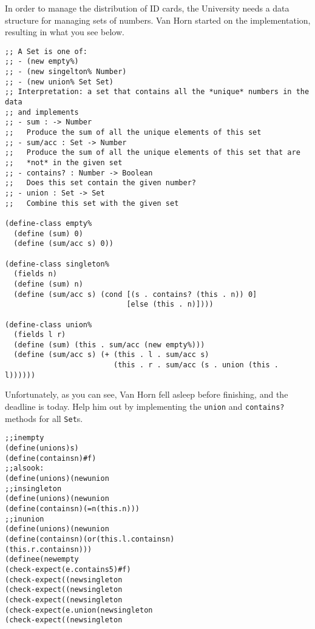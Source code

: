 \documentclass[12pt]{article}                   %
\def\pts#1{\marginpar{\footnotesize \raggedright  \fbox{#1 {\sc Points}}}}
\begin{document}
\vfill\thispagestyle{empty}
\newpage



\begin{problem} \pts{19}


In order to manage the distribution of ID cards, the University needs
a data structure for managing sets of numbers.  Van Horn started on
the implementation, resulting in what you see below.

\begin{verbatim}
;; A Set is one of:
;; - (new empty%)
;; - (new singelton% Number)
;; - (new union% Set Set)
;; Interpretation: a set that contains all the *unique* numbers in the data
;; and implements
;; - sum : -> Number
;;   Produce the sum of all the unique elements of this set
;; - sum/acc : Set -> Number
;;   Produce the sum of all the unique elements of this set that are
;;   *not* in the given set
;; - contains? : Number -> Boolean
;;   Does this set contain the given number?
;; - union : Set -> Set
;;   Combine this set with the given set

(define-class empty%
  (define (sum) 0)
  (define (sum/acc s) 0))

(define-class singleton%
  (fields n)
  (define (sum) n)
  (define (sum/acc s) (cond [(s . contains? (this . n)) 0]
                            [else (this . n)])))

(define-class union%
  (fields l r)
  (define (sum) (this . sum/acc (new empty%)))
  (define (sum/acc s) (+ (this . l . sum/acc s)
                         (this . r . sum/acc (s . union (this . l))))))
\end{verbatim}

\newpage

Unfortunately, as you can see, Van Horn fell asleep before finishing,
and the deadline is today.  Help him out by implementing the
\verb|union| and \verb|contains?| methods for all \verb|Set|s.


\ifrubric
\begin{alltt}
;; in empty%
(define (union s) s)
(define (contains n) #f)
;; also ok:
(define (union s) (new union% this s)
;; in singleton%
(define (union s) (new union% this s)
(define (contains n) (= n (this . n)))
;; in union%
(define (union s) (new union% this s)
(define (contains n) (or (this . l . contains n)
                         (this . r . contains n)))
(define e (new empty%))
(check-expect (e . contains 5) #f)
(check-expect ((new singleton% 5) . contains 5) #t)
(check-expect ((new singleton% 6) . contains 5) #f)
(check-expect ((new singleton% 6) . union  e . contains 5) #f)
(check-expect (e . union (new singleton% 5) . contains 5) #t)
(check-expect ((new singleton% 5) . union (new singleton% 5) . contains 5) #t)
\end{alltt}
\else
{}
\fi
\newpage


\end{problem}
\end{document}
